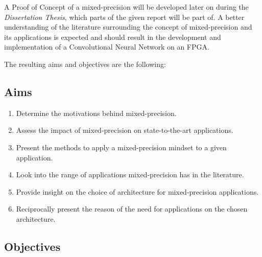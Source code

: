 A Proof of Concept of a mixed-precision will be developed later on during the \emph{Dissertation Thesis}, which parts of the given report will be part of. A better understanding of the literature surrounding the concept of mixed-precision and its applications is expected and should result in the development and implementation of a Convolutional Neural Network on an FPGA.

The resulting aims and objectives are the following:


\subsection{Aims}

\begin{enumerate}
  \item Determine the motivations behind mixed-precision.
  \item Assess the impact of mixed-precision on state-to-the-art applications.
  \item Present the methods to apply a mixed-precision mindset to a given application.
  \item Look into the range of applications mixed-precision has in the literature.
  \item Provide insight on the choice of architecture for mixed-precision applications.
  \item Reciprocally present the reason of the need for applications on the chosen architecture.
\end{enumerate}


\subsection{Objectives}

